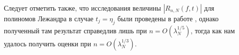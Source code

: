 \noindent Следует отметить также, что исследования величины $|R_{n,N}(f,t)|$ для полиномов Лежандра в случае $t_j = \eta_{j}$ были проведены в работе \cite{nunurik3}, однако полученный там результат справедлив лишь при $n = O(\lambda_N^{1/5})$, тогда как нам удалось получить оценки при $n = O(\lambda_N^{1/3})$.



